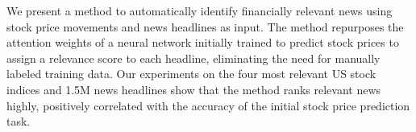 We present a method to automatically identify financially relevant news using stock price movements and news headlines as input. The method repurposes the attention weights of a neural network initially trained to predict stock prices to assign a relevance score to each headline, eliminating the need for manually labeled training data. Our experiments on the four most relevant US stock indices and 1.5M news headlines show that the method ranks relevant news highly, positively correlated with the accuracy of the initial stock price prediction task.
